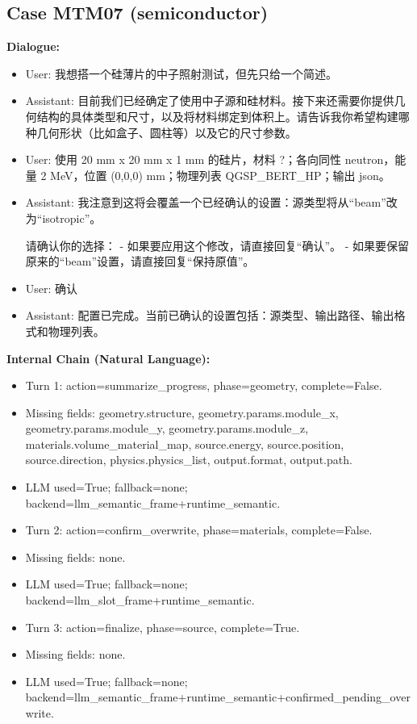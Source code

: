 \documentclass[11pt]{ctexart}
\begin{document}
\subsection{Case MTM07 (semiconductor)}
\textbf{Dialogue:}
\begin{itemize}
\item User: 我想搭一个硅薄片的中子照射测试，但先只给一个简述。
\item Assistant: 目前我们已经确定了使用中子源和硅材料。接下来还需要你提供几何结构的具体类型和尺寸，以及将材料绑定到体积上。请告诉我你希望构建哪种几何形状（比如盒子、圆柱等）以及它的尺寸参数。
\item User: 使用 20 mm x 20 mm x 1 mm 的硅片，材料 ?；各向同性 neutron，能量 2 MeV，位置 (0,0,0) mm；物理列表 QGSP\_BERT\_HP；输出 json。
\item Assistant: 我注意到这将会覆盖一个已经确认的设置：源类型将从“beam”改为“isotropic”。

请确认你的选择：
- 如果要应用这个修改，请直接回复“确认”。
- 如果要保留原来的“beam”设置，请直接回复“保持原值”。
\item User: 确认
\item Assistant: 配置已完成。当前已确认的设置包括：源类型、输出路径、输出格式和物理列表。
\end{itemize}
\textbf{Internal Chain (Natural Language):}
\begin{itemize}
\item Turn 1: action=summarize\_progress, phase=geometry, complete=False.
\item Missing fields: geometry.structure, geometry.params.module\_x, geometry.params.module\_y, geometry.params.module\_z, materials.volume\_material\_map, source.energy, source.position, source.direction, physics.physics\_list, output.format, output.path.
\item LLM used=True; fallback=none; backend=llm\_semantic\_frame+runtime\_semantic.
\item Turn 2: action=confirm\_overwrite, phase=materials, complete=False.
\item Missing fields: none.
\item LLM used=True; fallback=none; backend=llm\_slot\_frame+runtime\_semantic.
\item Turn 3: action=finalize, phase=source, complete=True.
\item Missing fields: none.
\item LLM used=True; fallback=none; backend=llm\_semantic\_frame+runtime\_semantic+confirmed\_pending\_overwrite.
\end{itemize}
\end{document}
